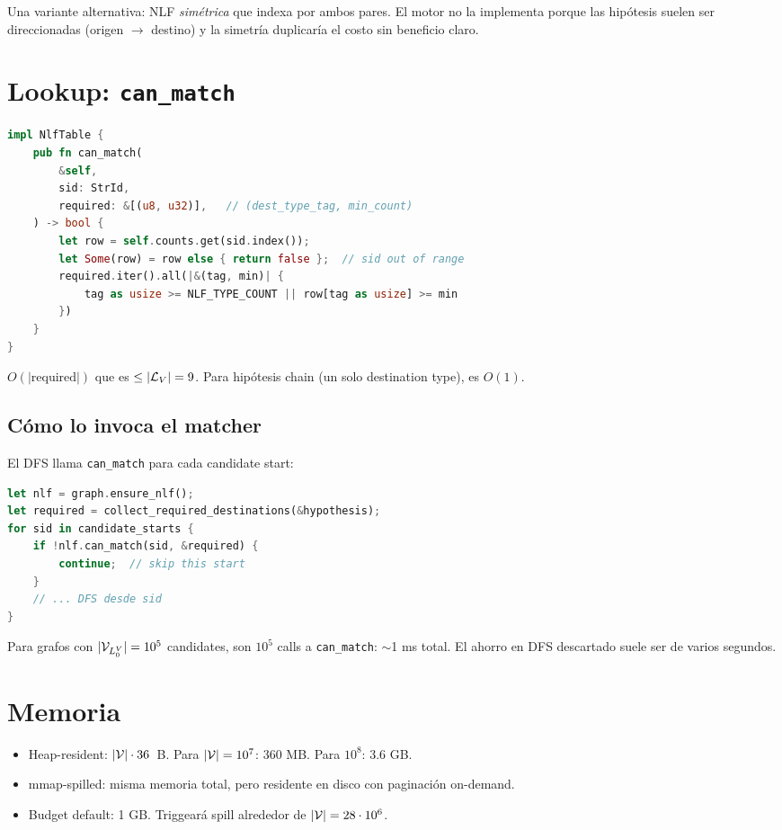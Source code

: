 Una variante alternativa: NLF \emph{simétrica} que indexa por
ambos pares. El motor no la implementa porque las hipótesis suelen
ser direccionadas (origen $\rightarrow$ destino) y la simetría
duplicaría el costo sin beneficio claro.

\section{Lookup: \texttt{can\_match}}

\begin{lstlisting}[language=Rust]
impl NlfTable {
    pub fn can_match(
        &self,
        sid: StrId,
        required: &[(u8, u32)],   // (dest_type_tag, min_count)
    ) -> bool {
        let row = self.counts.get(sid.index());
        let Some(row) = row else { return false };  // sid out of range
        required.iter().all(|&(tag, min)| {
            tag as usize >= NLF_TYPE_COUNT || row[tag as usize] >= min
        })
    }
}
\end{lstlisting}

\noindent
\(O(|\text{required}|)\) que es \(\leq |\mathcal{L}_V| = 9\). Para
hipótesis chain (un solo destination type), es \(O(1)\).

\subsection{Cómo lo invoca el matcher}

El DFS llama \texttt{can\_match} para cada candidate start:

\begin{lstlisting}[language=Rust]
let nlf = graph.ensure_nlf();
let required = collect_required_destinations(&hypothesis);
for sid in candidate_starts {
    if !nlf.can_match(sid, &required) {
        continue;  // skip this start
    }
    // ... DFS desde sid
}
\end{lstlisting}

\noindent
Para grafos con \(|\mathcal{V}_{L_0^V}| = 10^5\) candidates, son \(10^5\)
calls a \texttt{can\_match}: $\sim$1 ms total. El ahorro en DFS
descartado suele ser de varios segundos.

\section{Memoria}

\begin{itemize}
    \item Heap-resident: \(|\mathcal{V}| \cdot 36\)~B. Para \(|\mathcal{V}| = 10^7\):
    360 MB. Para \(10^8\): 3.6 GB.
    \item mmap-spilled: misma memoria total, pero residente en
    disco con paginación on-demand.
    \item Budget default: 1 GB. Triggeará spill alrededor de \(|\mathcal{V}|
    = 28 \cdot 10^6\).
\end{itemize}

